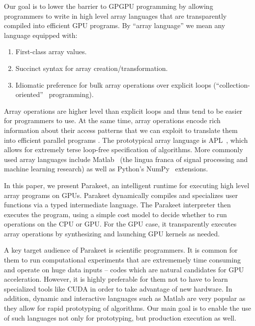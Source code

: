 \documentclass[preprint]{sigplanconf}
\begin{document}
Our goal is to lower the barrier to GPGPU programming by allowing programmers to write in high level array languages that are transparently compiled into efficient GPU programs. By ``array language'' we mean any language equipped with:
\begin{enumerate}
\item First-class array values.
\item Succinct syntax for array creation/transformation.
\item Idiomatic preference for bulk array operations over explicit loops (``collection-oriented''~\cite{Sip91} programming).
\end{enumerate}

Array operations are higher level than explicit loops and thus tend to be easier for programmers to use. At the same time, array operations encode rich information about their access patterns that we can exploit to translate them into efficient parallel programs \cite{Ju94}. The prototypical array language is APL~\cite{Iverson62}, which allows for extremely terse loop-free specification of algorithms. More commonly used array languages include Matlab~\cite{Moler80} (the lingua franca of signal processing and machine learning research) as well as Python's NumPy~\cite{Oliphant07} extensions.

In this paper, we present Parakeet, an intelligent runtime for executing high level array programs on GPUs. Parakeet dynamically compiles and specializes user functions via a typed intermediate language.  The Parakeet interpreter then executes the program, using a simple cost model to decide whether to run operations on the CPU or GPU.  For the GPU case, it transparently executes array operations by synthesizing and launching GPU kernels as needed.

A key target audience of Parakeet is scientific programmers. It is common for them to run computational experiments that are extrememely time consuming and operate on huge data inputs -- codes which are natural candidates for GPU acceleration. However, it is highly preferable for them not to have to learn specialized tools like CUDA in order to take advantage of new hardware.  In addition, dynamic and interactive languages such as Matlab are very popular as they allow for rapid prototyping of algorithms.  Our main goal is to enable the use of such languages not only for prototyping, but production execution as well.
\end{document}
